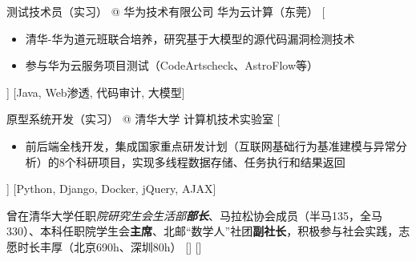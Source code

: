 \documentclass[zh]{resume}
\begin{document}
\begin{experiences}
    {测试技术员（实习） @ 华为技术有限公司 \textbullet 华为云计算（东莞）}%
    [\begin{itemize}
      \item 清华-华为道元班联合培养，研究基于大模型的源代码漏洞检测技术
      \item 参与华为云服务项目测试（CodeArtscheck、AstroFlow等）
    \end{itemize}]
    [Java, Web渗透, 代码审计, 大模型]

  \separator{0.5ex}
    {原型系统开发（实习） @ 清华大学 \textbullet 计算机技术实验室}%
    [\begin{itemize}
      \item 前后端全栈开发，集成国家重点研发计划（互联网基础行为基准建模与异常分析）的8个科研项目，实现多线程数据存储、任务执行和结果返回
    \end{itemize}]
    [Python, Django, Docker, jQuery, AJAX]
    
  \separator{0.5ex}
    {曾在清华大学任职\textit{院研究生会生活部\textbf{部长}}、马拉松协会成员（半马135，全马330）、本科任职院学生会\textbf{主席}、北邮“数学人”社团\textbf{副社长}，积极参与社会实践，志愿时长丰厚（北京690h、深圳80h）}%
    []
    []
\end{experiences}
\end{document}
